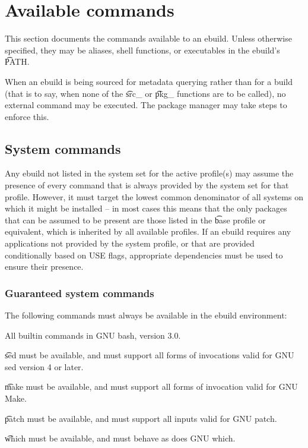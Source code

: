 \section{Available commands}
\label{ebuild-env-commands}

This section documents the commands available to an ebuild. Unless otherwise specified, they may be
aliases, shell functions, or executables in the ebuild's \t{PATH}.

When an ebuild is being sourced for metadata querying rather than for a build (that is to say,
when none of the \t{src\_} or \t{pkg\_} functions are to be called), no external command may
be executed. The package manager may take steps to enforce this.

\subsection{System commands}

Any ebuild not listed in the system set for the active profile(s) may assume the presence of every
command that is always provided by the system set for that profile. However, it must target the
lowest common denominator of all systems on which it might be installed -- in most cases this means
that the only packages that can be assumed to be present are those listed in the \t{base} profile or
equivalent, which is inherited by all available profiles. If an ebuild requires any applications not
provided by the system profile, or that are provided conditionally based on USE flags, appropriate
dependencies must be used to ensure their presence.

\subsubsection{Guaranteed system commands}

The following commands must always be available in the ebuild environment:
\begin{bulletlist}
\item All builtin commands in GNU bash, version 3.0.
\item \t{sed} must be available, and must support all forms of invocations valid for GNU sed
    version 4 or later.
\item \t{make} must be available, and must support all forms of invocation valid for GNU Make.
\item \t{patch} must be available, and must support all inputs valid for GNU patch.
\item \t{which} must be available, and must behave as does GNU which.
\end{bulletlist}


